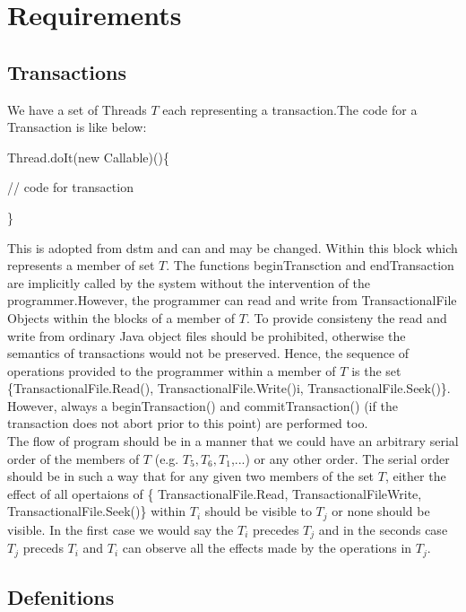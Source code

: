 \documentclass[a4paper, 11pt]{article}
\begin{document}
\section{Requirements}
\subsection{Transactions}
We have a set of Threads $T$ each representing a transaction.The code for a 
Transaction is like below:

\hspace{12mm}	Thread.doIt(new Callable)()\{

\hspace{12mm}		// code for transaction

\hspace{12mm}	\}

This is adopted from dstm and can and may be changed. Within this block which 
represents a member of set $T$. The functions beginTransction and endTransaction are implicitly called by the system without the intervention of the programmer.However, the programmer can read and write from TransactionalFile Objects within the blocks of a member of $T$. To provide consisteny the read and write from ordinary Java object files should be prohibited, otherwise the semantics of transactions would not be preserved. Hence, the sequence of operations provided to the programmer within a member of $T$ is the set \{TransactionalFile.Read(), TransactionalFile.Write()i, TransactionalFile.Seek()\}. However, always a beginTransaction() and commitTransaction() (if the transaction does not abort prior to this point) are performed too. \\ 

The flow of program should be in a manner that we could have an arbitrary serial order of the members of $T$ (e.g. $T_5,T_6,T_1$,...) or any other order. The serial order should be in such a way that for any given two members of the set $T$, either the effect of all opertaions of \{ TransactionalFile.Read, TransactionalFileWrite, TransactionalFile.Seek()\} within $T_i$ should be visible to $T_j$ or none should be visible. In the first case we would say the $T_i$ precedes $T_j$ and in the seconds case $T_j$ preceds $T_i$ and $T_i$ can observe all the effects made by the operations in $T_j$. \\

\subsection{Defenitions}
\end{document}
